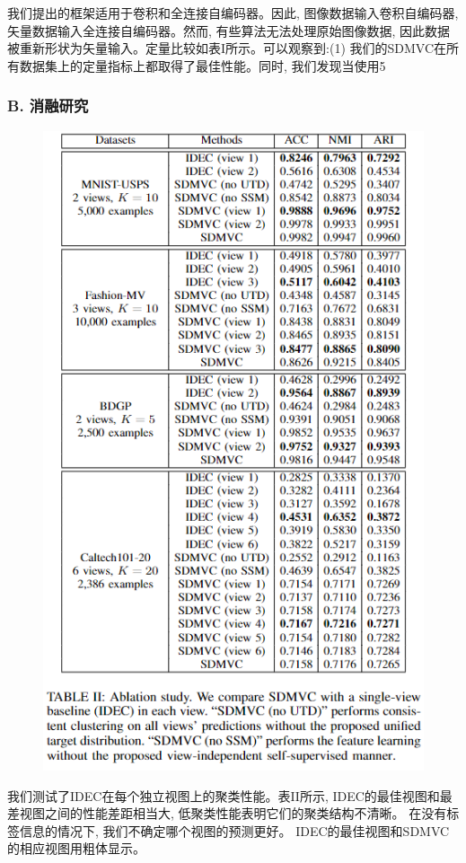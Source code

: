 \documentclass{article}
\begin{document}
我们提出的框架适用于卷积和全连接自编码器。因此, 图像数据输入卷积自编码器, 矢量数据输入全连接自编码器。然而, 有些算法无法处理原始图像数据, 因此数据被重新形状为矢量输入。定量比较如表I所示。可以观察到:(1) 我们的SDMVC在所有数据集上的定量指标上都取得了最佳性能。同时, 我们发现当使用5%

\subsubsection*{B. 消融研究}

\begin{figure}[h]
    \centering
    \includegraphics[width=0.4\linewidth]{./imgs/img5.png}
\end{figure}


我们测试了IDEC在每个独立视图上的聚类性能。表II所示, IDEC的最佳视图和最差视图之间的性能差距相当大, 低聚类性能表明它们的聚类结构不清晰。
在没有标签信息的情况下, 我们不确定哪个视图的预测更好。
IDEC的最佳视图和SDMVC的相应视图用粗体显示。
\end{document}
